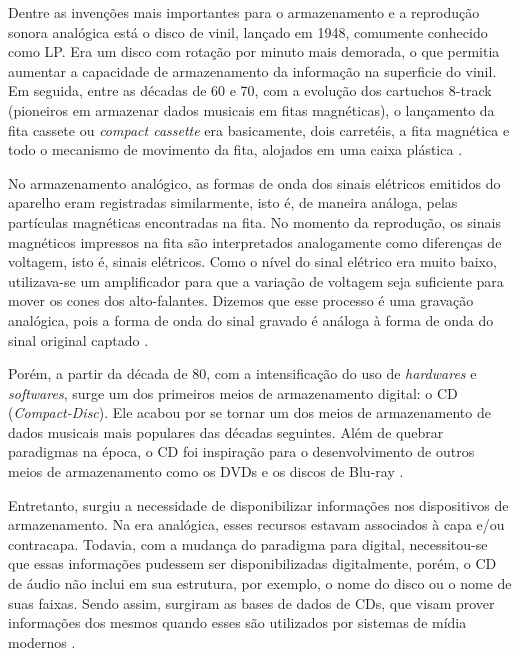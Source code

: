 Dentre as invenções mais importantes para o armazenamento e a reprodução sonora analógica está o disco de vinil, lançado em 1948, comumente conhecido como LP. Era um disco com rotação por minuto mais demorada, o que permitia aumentar a capacidade de armazenamento da informação na superficie do vinil. Em seguida, entre as décadas de 60 e 70, com a evolução dos cartuchos 8-track (pioneiros em armazenar dados musicais em fitas magnéticas), o lançamento da fita cassete ou \textit{compact cassette} \cite{marchi2005} era basicamente, dois carretéis, a fita magnética e todo o mecanismo de movimento da fita, alojados em uma caixa plástica \cite{andrade&crispim2008}.

No armazenamento analógico, as formas de onda dos sinais elétricos emitidos do aparelho eram registradas similarmente, isto é, de maneira análoga, pelas partículas magnéticas encontradas na fita. No momento da reprodução, os sinais magnéticos impressos na fita são interpretados analogamente como diferenças de voltagem, isto é, sinais elétricos. Como o nível do sinal elétrico era muito baixo, utilizava-se um amplificador para que a variação de voltagem seja suficiente para mover os cones dos alto-falantes. Dizemos que esse processo é uma gravação analógica, pois a forma de onda do sinal gravado é análoga à forma de onda do sinal original captado \cite{paulozuben2004}.

Porém, a partir da década de 80, com a intensificação do uso de \textit{hardwares} e \textit{softwares}, surge um dos primeiros meios de armazenamento digital: o CD (\textit{Compact-Disc}). Ele acabou por se tornar um dos meios de armazenamento de dados musicais mais populares das décadas seguintes. Além de quebrar paradigmas na época, o CD foi inspiração para o desenvolvimento de outros meios de armazenamento como os DVDs e os discos de Blu-ray \cite{marchi2005}.

Entretanto, surgiu a necessidade de disponibilizar informações nos dispositivos de armazenamento. Na era analógica, esses recursos estavam associados à capa e/ou contracapa. Todavia, com a mudança do paradigma para digital, necessitou-se que essas informações pudessem ser disponibilizadas digitalmente, porém, o CD de áudio não inclui em sua estrutura, por exemplo, o nome do disco ou o nome de suas faixas. Sendo assim, surgiram as bases de dados de CDs, que visam prover informações dos mesmos quando esses são utilizados por sistemas de mídia modernos \cite{andrade&crispim2008}.

